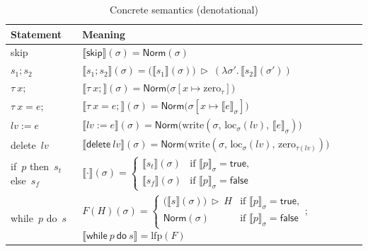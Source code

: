 \documentclass[11pt,oneside]{report}
\renewcommand\arraystretch{1.3}
\theoremstyle{plain}
\theoremstyle{definition}
\theoremstyle{remark}
\newcommand{\Norm}{\mathsf{Norm}}
\begin{document}
\setcounter{table}{3}
\begin{table}[t]
  \caption{Concrete semantics (denotational)}
  \label{tab:conc-denot}
  \centering
  \small
  \setlength{\tabcolsep}{6pt}
  \renewcommand{\arraystretch}{1.12}
  \begin{tabularx}{\columnwidth}{@{}p{} X@{}}
    \toprule
    \textbf{Statement} & \textbf{Meaning} \\
    \midrule
    \textsf{skip} &
    $\llbracket \textsf{skip}\rrbracket(\sigma)=\Norm(\sigma)$\\

    $s_1; s_2$ &
    $\llbracket s_1; s_2\rrbracket(\sigma)=\big(\llbracket s_1\rrbracket(\sigma)\big)\ \triangleright\ (\lambda \sigma'.\,\llbracket s_2\rrbracket(\sigma'))$\\

    $\tau\ x;$ &
    $\llbracket \tau\ x;\rrbracket(\sigma)=\Norm\!\big(\sigma[x\mapsto \mathrm{zero}_\tau]\big)$\\

    $\tau\ x=e;$ &
    $\llbracket \tau\ x=e;\rrbracket(\sigma)=\Norm\!\big(\sigma[x\mapsto \llbracket e\rrbracket_\sigma]\big)$\\

    $\mathit{lv}:=e$ &
    $\llbracket \mathit{lv}:=e\rrbracket(\sigma)=\Norm\!\big(\mathrm{write}(\sigma,\,\mathrm{loc}_\sigma(\mathit{lv}),\,\llbracket e\rrbracket_\sigma)\big)$\\

    \textsf{delete}\ $\mathit{lv}$ &
    $\llbracket \textsf{delete}\ \mathit{lv}\rrbracket(\sigma)=\Norm\!\big(\mathrm{write}(\sigma,\,\mathrm{loc}_\sigma(\mathit{lv}),\,\mathrm{zero}_{\tau(\mathit{lv})})\big)$\\

    \textsf{if}\ $p$ \textsf{then}\ $s_t$ \textsf{else}\ $s_f$ &
    $\llbracket \cdot\rrbracket(\sigma)=
      \begin{cases}
        \llbracket s_t\rrbracket(\sigma) & \text{if }\llbracket p\rrbracket_\sigma=\mathsf{true},\\
        \llbracket s_f\rrbracket(\sigma) & \text{if }\llbracket p\rrbracket_\sigma=\mathsf{false}
      \end{cases}$\\

    \textsf{while}\ $p$ \textsf{do}\ $s$ &
    $F(H)(\sigma)=
      \begin{cases}
        \big(\llbracket s\rrbracket(\sigma)\big)\ \triangleright\ H & \text{if }\llbracket p\rrbracket_\sigma=\mathsf{true},\\
        \Norm(\sigma) & \text{if }\llbracket p\rrbracket_\sigma=\mathsf{false}
      \end{cases}$;
    $\llbracket \textsf{while}\ p\ \textsf{do}\ s\rrbracket=\mathrm{lfp}(F)$\\


\end{tabularx}
\end{table}
\end{document}
